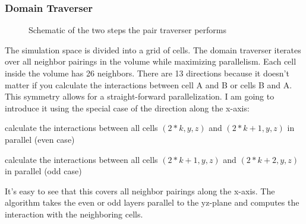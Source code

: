 \subsubsection{Domain Traverser}
\begin{figure}
  \centering
  \caption{Schematic of the two steps the pair traverser performs}
\end{figure}
The simulation space is divided into a grid of cells.  The domain traverser iterates over all neighbor pairings in the volume while maximizing parallelism. Each cell inside the volume has 26 neighbors. There are 13 directions because it doesn't matter if you calculate the interactions between cell A and B or cells B and A. This symmetry allows for a straight-forward parallelization.
I am going to introduce it using the special case of the direction along the x-axis:
\begin{compactenum}
\item calculate the interactions between all cells $ \left ( 2*k, y, z \right ) $ and $ \left ( 2*k + 1, y, z \right ) $ in parallel (even case)
\item calculate the interactions between all cells $ \left ( 2*k + 1, y, z \right ) $ and $ \left ( 2*k + 2, y, z \right ) $ in parallel (odd case)
\end{compactenum}
It's easy to see that this covers all neighbor pairings along the x-axis. 
The algorithm takes the even or odd layers parallel to the yz-plane and computes the interaction with the neighboring cells.

